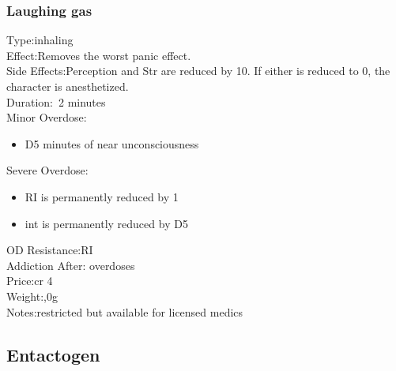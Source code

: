 \subsubsection{Laughing gas}
Type:\tab inhaling\\
Effect:\tab Removes the worst panic effect.\\
Side Effects:\tab Perception and Str are reduced by 10. If either is reduced to 0, the character is anesthetized.\\
Duration:\tab ~2 minutes\\
Minor Overdose:\\
\begin{itemize}
	\setlength\itemsep{-8mm}
	\vspace{-12mm}
	\item D5 minutes of near unconsciousness
\end{itemize}
Severe Overdose:\\
\begin{itemize}
	\setlength\itemsep{-8mm}
	\vspace{-12mm}
	\item RI is permanently reduced by 1
	\item int is permanently reduced by D5
\end{itemize}
OD Resistance:\tab RI\\
Addiction After: overdoses\\
Price:\tab cr 4\\
Weight:,0g\\
Notes:\tab restricted but available for licensed medics


\subsection{Entactogen}
